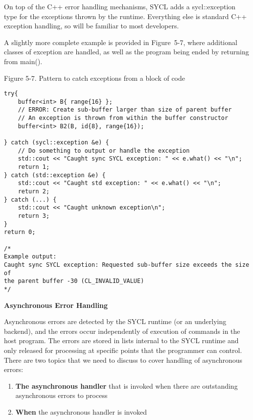 On top of the C++ error handling mechanisms, SYCL adds a sycl::exception type for the exceptions thrown by the runtime. Everything else is standard C++ exception handling, so will be familiar to most developers.\par

A slightly more complete example is provided in Figure 5-7, where additional classes of exception are handled, as well as the program being ended by returning from main().\par

\hspace*{\fill} \par %
Figure 5-7. Pattern to catch exceptions from a block of code
\begin{lstlisting}[caption={}]
try{
	buffer<int> B{ range{16} };
	// ERROR: Create sub-buffer larger than size of parent buffer
	// An exception is thrown from within the buffer constructor
	buffer<int> B2(B, id{8}, range{16});
	
} catch (sycl::exception &e) {
	// Do something to output or handle the exception 
	std::cout << "Caught sync SYCL exception: " << e.what() << "\n";
	return 1;
} catch (std::exception &e) {
	std::cout << "Caught std exception: " << e.what() << "\n";
	return 2;
} catch (...) {
	std::cout << "Caught unknown exception\n";
	return 3;
}
return 0;

/*
Example output:
Caught sync SYCL exception: Requested sub-buffer size exceeds the size of 
the parent buffer -30 (CL_INVALID_VALUE)
*/
\end{lstlisting}

\hspace*{\fill} \par %
\textbf{Asynchronous Error Handling}

Asynchronous errors are detected by the SYCL runtime (or an underlying backend), and the errors occur independently of execution of commands in the host program. The errors are stored in lists internal to the SYCL runtime and only released for processing at specific points that the programmer can control. There are two topics that we need to discuss to cover handling of asynchronous errors:\par

\begin{enumerate}
	\item \textbf{The asynchronous handler} that is invoked when there are outstanding asynchronous errors to process
	\item \textbf{When} the asynchronous handler is invoked
\end{enumerate}

